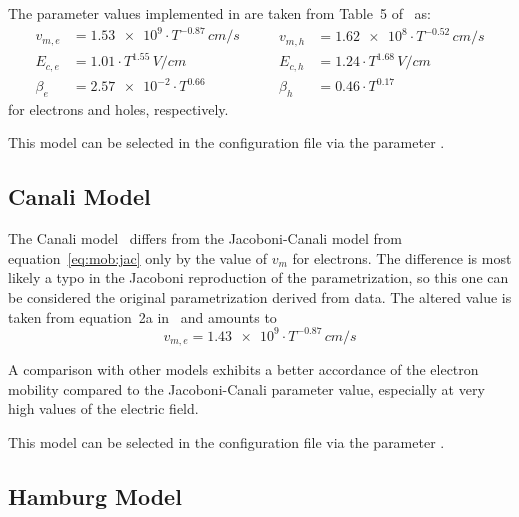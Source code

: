 The parameter values implemented in \apsq are taken from Table~5 of~\cite{jacoboni} as:
\begin{equation*}
    \begin{split}
        v_{m,e} &= \num{1.53e9} \cdot T^{-0.87}\,\si{cm \per s}\\
        E_{c,e} &= \num{1.01} \cdot T^{1.55}\,\si{V \per cm}\\
        \beta_e &= \num{2.57e-2} \cdot T^{0.66}
    \end{split}
    \qquad
    \begin{split}
        v_{m,h} &= \num{1.62e8} \cdot T^{-0.52}\,\si{cm \per s}\\
        E_{c,h} &= \num{1.24} \cdot T^{1.68}\,\si{V \per cm}\\
        \beta_h &= \num{0.46} \cdot T^{0.17}
    \end{split}
\end{equation*}
for electrons and holes, respectively.

This model can be selected in the configuration file via the parameter .

\subsection{Canali Model}
\label{sec:mob:can}

The Canali model~\cite{canali} differs from the Jacoboni-Canali model from equation~\eqref{eq:mob:jac} only by the value of $v_m$ for electrons.
The difference is most likely a typo in the Jacoboni reproduction of the parametrization, so this one can be considered the original parametrization derived from data.
The altered value is taken from equation~2a in~\cite{canali} and amounts to
\begin{equation*}
    v_{m,e} = \num{1.43e9} \cdot T^{-0.87}\,\si{cm \per s}
\end{equation*}

A comparison with other models exhibits a better accordance of the electron mobility compared to the Jacoboni-Canali parameter value, especially at very high values of the electric field.

This model can be selected in the configuration file via the parameter .

\subsection{Hamburg Model}

